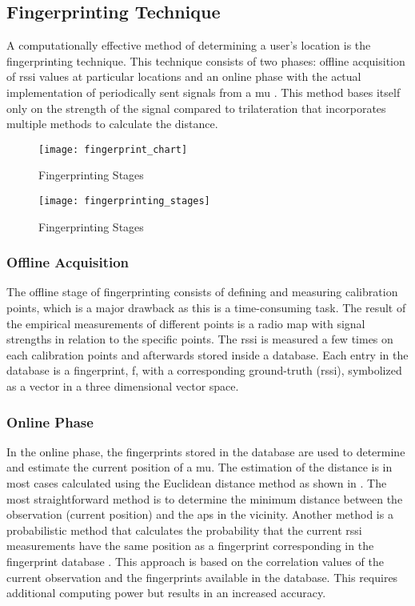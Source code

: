 \subsection{Fingerprinting Technique}
A computationally effective method of determining a user's location is the fingerprinting technique. This technique consists of two phases: offline acquisition of \acrshort{rssi} values at particular locations and an online phase with the actual implementation of periodically sent signals from a \acrshort{mu} \cite[p.~9]{Retscher}. This method bases itself only on the strength of the signal compared to trilateration that incorporates multiple methods to calculate the distance.
\begin{figure}[h!]
\centering
\texttt{[image: fingerprint\_chart]}
\caption{Fingerprinting Stages ~\cite[p.11]{S2016}}
\label{fig:fingerprint_chart}
\end{figure}
\begin{figure}[h!]
\centering
\texttt{[image: fingerprinting\_stages]}
\caption{Fingerprinting Stages ~\cite[p.2]{Li}}
\label{fig:fingerprint_stages}
\end{figure}
\subsubsection{Offline Acquisition}
The offline stage of fingerprinting consists of defining and measuring calibration points, which is a major drawback as this is a time-consuming task. The result of the empirical measurements of different points is a radio map with signal strengths in relation to the specific points. The \acrshort{rssi} is measured a few times on each calibration points and afterwards stored inside a database. Each entry in the database is a fingerprint, f, with a corresponding ground-truth (\acrshort{rssi}), symbolized as a vector in a three dimensional vector space.
\subsubsection{Online Phase}
In the online phase, the fingerprints stored in the database are used to determine and estimate the current position of a \acrshort{mu}. The estimation of the distance is in most cases calculated using the Euclidean distance method as shown in \cite{fig:euclidean}. The most straightforward method is to determine the minimum distance between the observation (current position) and the \acrshort{ap}s in the vicinity. Another method is a probabilistic method that calculates the probability that the current \acrlong{rssi} measurements have the same position as a fingerprint corresponding in the fingerprint database \cite{Mautz}. This approach is based on the correlation values of the current observation and the fingerprints available in the database. This requires additional computing power but results in an increased accuracy.
